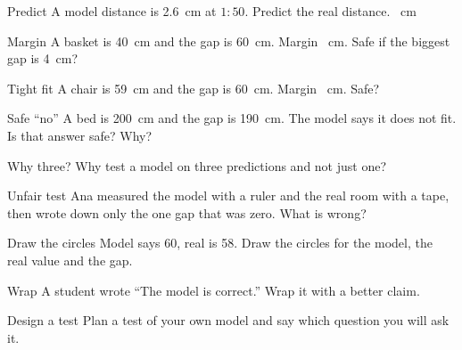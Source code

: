 \begin{puzzle}{Predict}
A model distance is 2.6~cm at $1:50$. Predict the real distance. \wline[1.6cm]~cm
\end{puzzle}

\begin{puzzle}{Margin}
A basket is 40~cm and the gap is 60~cm. Margin \wline[1.6cm]~cm. Safe if the biggest gap is 4~cm? \wline[2cm]
\end{puzzle}

\begin{puzzle}{Tight fit}
A chair is 59~cm and the gap is 60~cm. Margin \wline[1.6cm]~cm. Safe? \wline[2cm]
\end{puzzle}

\begin{puzzle}{Safe ``no''}
A bed is 200~cm and the gap is 190~cm. The model says it does not fit. Is that answer safe? \wline[2cm] Why? \wline[4cm]
\end{puzzle}

\clearpage

\begin{puzzle}{Why three?}
Why test a model on three predictions and not just one? \wline[6cm]
\end{puzzle}

\begin{puzzle}{Unfair test}
Ana measured the model with a ruler and the real room with a tape, then wrote down only the one gap that was zero. What is wrong? \wline[6cm]
\end{puzzle}

\begin{puzzle}{Draw the circles}
Model says 60, real is 58. Draw the circles for the model, the real value and the gap.
\begin{center}\end{center}
\end{puzzle}

\begin{puzzle}{Wrap}
A student wrote ``The model is correct.'' Wrap it with a better claim. \wline[6cm]
\end{puzzle}

\begin{puzzle}{Design a test}
Plan a test of your own model and say which question you will ask it. \wline[6cm]
\end{puzzle}
\clearpage

